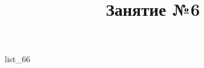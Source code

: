 \documentclass[12pt, a4paper]{article}
\begin{document}
	\title{Занятие №6}
	{list_66}
\end{document}
